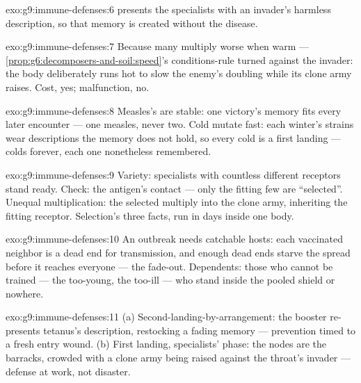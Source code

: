 \begin{solution}{exo:g9:immune-defenses:6}
 presents the  specialists with an
invader's harmless description, so that memory is created
without the disease.
\end{solution}

\begin{solution}{exo:g9:immune-defenses:7}
Because many  multiply worse when warm ---
\cref{prop:g6:decomposers-and-soil:speed}'s conditions-rule
turned against the invader: the body deliberately runs hot
to slow the enemy's doubling while its clone army raises.
Cost, yes; malfunction, no.
\end{solution}

\begin{solution}{exo:g9:immune-defenses:8}
Measles's  are stable: one victory's memory fits
every later encounter --- one measles, never two. Cold
 mutate fast: each winter's strains wear
descriptions the memory does not hold, so every cold is a
first landing --- colds forever, each one nonetheless
remembered.
\end{solution}

\begin{solution}{exo:g9:immune-defenses:9}
Variety: specialists with countless different receptors
stand ready. Check: the antigen's contact --- only the
fitting few are ``selected''. Unequal multiplication: the
selected multiply into the clone army, inheriting the
fitting receptor. Selection's three facts, run in days
inside one body.
\end{solution}

\begin{solution}{exo:g9:immune-defenses:10}
An outbreak needs catchable hosts: each vaccinated
neighbor is a dead end for transmission, and enough dead
ends starve the spread before it reaches everyone ---
the fade-out. Dependents: those who cannot be trained ---
the too-young, the too-ill --- who stand inside the pooled
shield or nowhere.
\end{solution}

\begin{solution}{exo:g9:immune-defenses:11}
(a) Second-landing-by-arrangement: the booster re-presents
tetanus's description, restocking a fading memory ---
prevention timed to a fresh entry wound. (b) First
landing, specialists' phase: the nodes are the barracks,
crowded with a clone army being raised against the
throat's invader --- defense at work, not disaster.
\end{solution}

